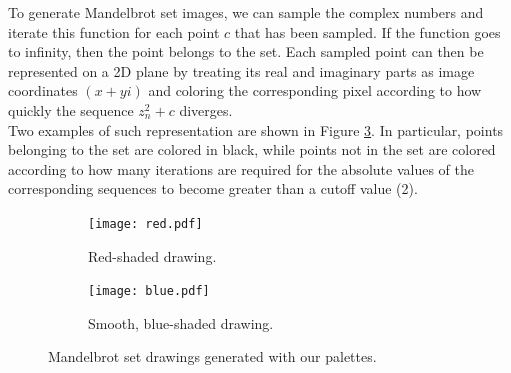 \documentclass[11pt,a4paper]{article}
\begin{document}
To generate Mandelbrot set images, we can sample the complex numbers and iterate this function for each point $c$ that has been sampled.
If the function goes to infinity, then the point belongs to the set.
Each sampled point can then be represented on a 2D plane by treating its real and imaginary parts as image coordinates $(x+yi)$ and coloring the corresponding pixel according to how quickly the sequence $z_{n}^2 + c$ diverges.\\
Two examples of such representation are shown in Figure \ref{fig:both-mandelbrot}.
In particular, points belonging to the set are colored in black, while points not in the set are colored according to how many iterations are required for the absolute values of the corresponding sequences to become greater than a cutoff value (2).\\
\begin{figure}[t]
	\vspace{-0.5cm}
	\centering
	\begin{subfigure}{.35\textwidth}
		\centering
		\texttt{[image: red.pdf]}
		\caption{Red-shaded drawing.}
		\label{fig:mandelbrot-red}
	\end{subfigure}%
	\begin{subfigure}{.35\textwidth}
		\centering
		\texttt{[image: blue.pdf]}
		\caption{Smooth, blue-shaded drawing.}
		\label{fig:mandelbrot-blue}
	\end{subfigure}
	\vspace{-0.3cm}
	\caption{Mandelbrot set drawings generated with our palettes.}
	\label{fig:both-mandelbrot}
\end{figure}
\end{document}
